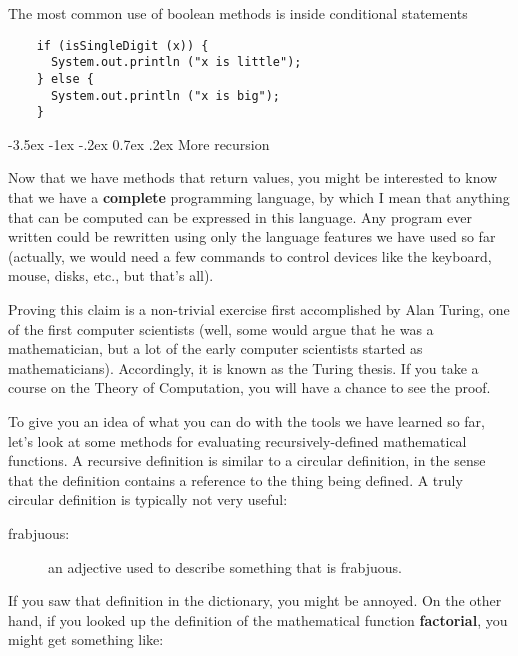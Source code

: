 \documentclass{book}
\makeatletter
\renewcommand{\section}{\@startsection 
    {section} {1} {0mm}%
    {-3.5ex \@plus -1ex \@minus -.2ex}%
    {0.7ex \@plus.2ex}%
    {\normalfont\Large\bfseries}}
\makeatother
\begin{document}
The most common use of boolean methods is inside conditional
statements

\begin{verbatim}
    if (isSingleDigit (x)) {
      System.out.println ("x is little");
    } else {
      System.out.println ("x is big");
    }
\end{verbatim}

\section {More recursion}

Now that we have methods that return values, you might be interested
to know that we have a {\bf complete} programming language, by which I
mean that anything that can be computed can be expressed in this
language.  Any program ever written could be rewritten
using only the language features we have used so far (actually, we
would need a few commands to control devices like the keyboard, mouse,
disks, etc., but that's all).


Proving this claim is a non-trivial exercise first
accomplished by Alan Turing, one of the first computer scientists
(well, some would argue that he was a mathematician, but a lot of the
early computer scientists started as mathematicians).  Accordingly, it
is known as the Turing thesis.  If you take a course on the Theory of
Computation, you will have a chance to see the proof.

To give you an idea of what you can do with the tools we have learned
so far, let's look at some methods for evaluating
recursively-defined mathematical functions.  A recursive definition is
similar to a circular definition, in the sense that the definition
contains a reference to the thing being defined.  A truly circular
definition is typically not very useful:

\begin{description}

\item[frabjuous:] an adjective used to describe
something that is frabjuous.


\end{description}

If you saw that definition in the dictionary, you might be
annoyed.  On the other hand, if you looked up the definition
of the mathematical function {\bf factorial}, you might
get something like:
\end{document}
